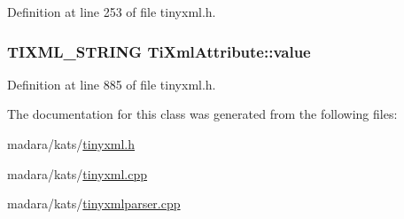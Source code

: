 Definition at line 253 of file tinyxml.h.

\hypertarget{classTiXmlAttribute_ae9e4e5f442347434b1da43954cc1b411}{
\subsubsection[{value}]{\setlength{\rightskip}{0pt plus 5cm}TIXML\_\-STRING {\bf TiXmlAttribute::value}}}
\label{d4/dc1/classTiXmlAttribute_ae9e4e5f442347434b1da43954cc1b411}


Definition at line 885 of file tinyxml.h.



The documentation for this class was generated from the following files:\begin{DoxyCompactItemize}
\item 
madara/kats/\hyperlink{tinyxml_8h}{tinyxml.h}\item 
madara/kats/\hyperlink{tinyxml_8cpp}{tinyxml.cpp}\item 
madara/kats/\hyperlink{tinyxmlparser_8cpp}{tinyxmlparser.cpp}\end{DoxyCompactItemize}
